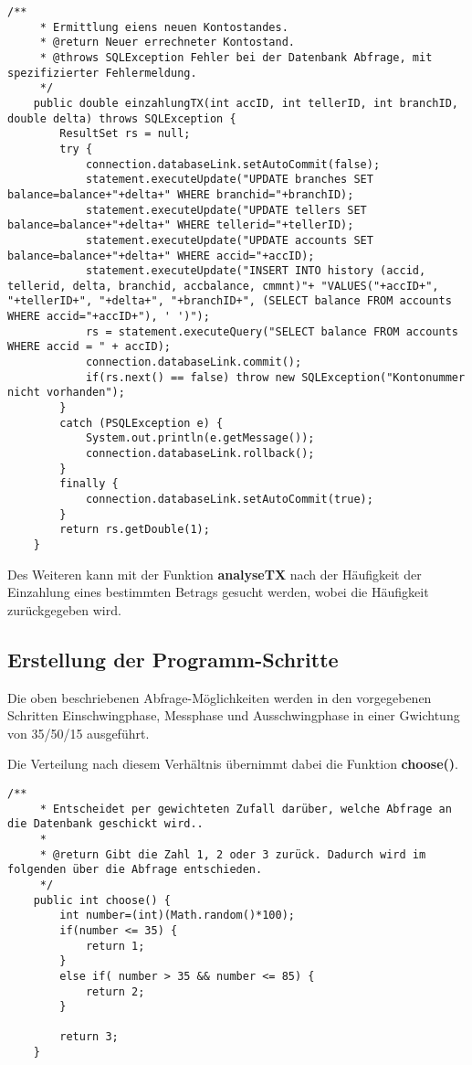 \begin{lstlisting}[caption={einzahlungTX-Funktion in TXHandler.java}]
	/**
	 * Ermittlung eiens neuen Kontostandes.
	 * @return Neuer errechneter Kontostand.
	 * @throws SQLException Fehler bei der Datenbank Abfrage, mit spezifizierter Fehlermeldung.
	 */
	public double einzahlungTX(int accID, int tellerID, int branchID, double delta) throws SQLException	{
		ResultSet rs = null;
		try {
			connection.databaseLink.setAutoCommit(false);
			statement.executeUpdate("UPDATE branches SET balance=balance+"+delta+" WHERE branchid="+branchID);
			statement.executeUpdate("UPDATE tellers SET balance=balance+"+delta+" WHERE tellerid="+tellerID);
			statement.executeUpdate("UPDATE accounts SET balance=balance+"+delta+" WHERE accid="+accID);
			statement.executeUpdate("INSERT INTO history (accid, tellerid, delta, branchid, accbalance, cmmnt)"+ "VALUES("+accID+", "+tellerID+", "+delta+", "+branchID+", (SELECT balance FROM accounts WHERE accid="+accID+"), ' ')");
			rs = statement.executeQuery("SELECT balance FROM accounts WHERE accid = " + accID);
			connection.databaseLink.commit();
			if(rs.next() == false) throw new SQLException("Kontonummer nicht vorhanden");
		}
		catch (PSQLException e) {
			System.out.println(e.getMessage());
			connection.databaseLink.rollback();
		}
		finally {
			connection.databaseLink.setAutoCommit(true);
		}
		return rs.getDouble(1);
	}
\end{lstlisting}
 

Des Weiteren kann mit der Funktion \textbf{analyseTX} nach der Häufigkeit der
Einzahlung eines bestimmten Betrags gesucht werden, wobei die Häufigkeit zurückgegeben wird.

\subsection{Erstellung der Programm-Schritte}
Die oben beschriebenen Abfrage-Möglichkeiten werden in den vorgegebenen
Schritten Einschwingphase, Messphase und Ausschwingphase in einer Gwichtung von
35/50/15 ausgeführt.

Die Verteilung nach diesem Verhältnis übernimmt dabei die Funktion
\textbf{choose()}.

\begin{lstlisting}[caption={choose-Funktion in ProgramStage.java}]
	/**
	 * Entscheidet per gewichteten Zufall darüber, welche Abfrage an die Datenbank geschickt wird..
	 * 
	 * @return Gibt die Zahl 1, 2 oder 3 zurück. Dadurch wird im folgenden über die Abfrage entschieden.
	 */
	public int choose() {
		int number=(int)(Math.random()*100);
		if(number <= 35) {
			return 1;
		}
		else if( number > 35 && number <= 85) {
			return 2;
		}
		
		return 3;
	}
\end{lstlisting}

